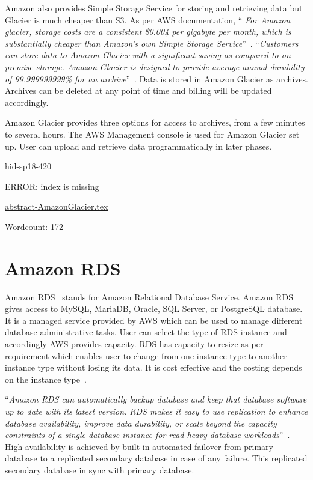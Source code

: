 Amazon also provides Simple Storage Service for storing and retrieving data but
Glacier is much cheaper than S3. As per AWS documentation, \color{blue}``\emph{ For Amazon glacier,
storage costs are a consistent \$0.004 per gigabyte per month, which is
substantially cheaper than Amazon's own Simple Storage
Service}''\color{black}~\cite{hid-sp18-420-Amazon-Glacier-FAQ}. \color{blue}``\emph{Customers can store data to
Amazon Glacier with a significant saving as compared to on-premise storage.
Amazon Glacier is designed to provide average annual durability of
99.999999999\% for an archive}''\color{black}~\cite{hid-sp18-420-Amazon-Glacier}. Data is
stored in Amazon Glacier as archives. Archives can be deleted at any point of
time and billing will be updated accordingly.

Amazon Glacier provides three options for access to archives, from a few minutes
to several hours. The AWS Management console is used for Amazon Glacier set up.
User can upload and retrieve data programmatically in later phases.


\begin{IU}

hid-sp18-420

ERROR: index is missing

\href{https://github.com/cloudmesh-community/hid-sp18-420/blob/master//technology/abstract-AmazonGlacier.tex}{abstract-AmazonGlacier.tex}

 

Wordcount: 172

\end{IU}

\section{Amazon RDS}

Amazon RDS~\cite{hid-sp18-420-amazon-RDS} stands for Amazon Relational Database
Service. Amazon RDS gives access to MySQL, MariaDB, Oracle, SQL Server, or
PostgreSQL database. It is a managed service provided by AWS which can be used
to manage different database administrative tasks. User can select the type of
RDS instance and accordingly AWS provides capacity. RDS has capacity to resize
as per requirement which enables user to change from one instance type to
another instance type without losing its data. It is cost effective and the
costing depends on the instance type~\cite{hid-sp18-420-amazon-RDS-FAQ}.

\color{blue}``\emph{Amazon RDS can automatically backup database and keep that database software
up to date with its latest version. RDS makes it easy to use replication to
enhance database availability, improve data durability, or scale beyond the
capacity constraints of a single database instance for read-heavy database
workloads}''\color{black}~\cite{hid-sp18-420-amazon-RDS-FAQ}. High availability is achieved by
built-in automated failover from primary database to a replicated secondary
database in case of any failure. This replicated secondary database in sync with
primary database.


